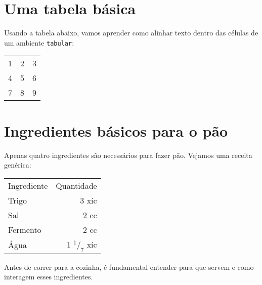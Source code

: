 \documentclass[a4paper,oneside]{article}
\begin{document}
\frenchspacing

\section{Uma tabela básica}

Usando a tabela abaixo, vamos aprender como alinhar texto dentro das células de
um ambiente \texttt{tabular}:

\begin{center}
  \begin{tabular}{l c r}
    1 & 2 & 3\\
    4 & 5 & 6\\
    7 & 8 & 9\\
  \end{tabular}
\end{center}

\section{Ingredientes básicos para o pão}

Apenas quatro ingredientes são necessários para fazer pão. Vejamos uma receita
genérica:

\begin{center}
  \begin{tabular}{lr}
    Ingrediente & Quantidade\\[5pt]
    Trigo    & 3 xíc\\
    Sal      & 2 cc\\
    Fermento & 2 cc\\
    Água     & 1 $^1/_7$ xíc
  \end{tabular}
\end{center}

Antes de correr para a cozinha, é fundamental entender para que servem e como
interagem esses ingredientes.
\end{document}
